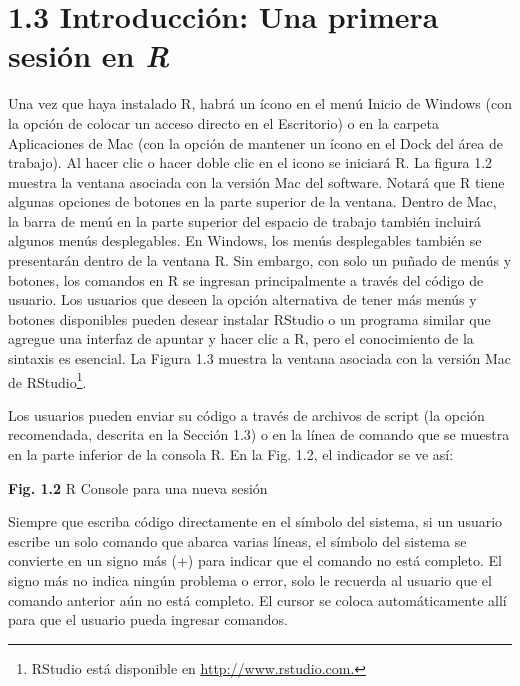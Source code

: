 \documentclass[
]{book}
\begin{document}
\hypertarget{introducciuxf3n-una-primera-sesiuxf3n-en-r}{%
\section*{\texorpdfstring{\textbf{1.3 Introducción: Una primera sesión en \emph{R}}}{1.3 Introducción: Una primera sesión en R}}\label{introducciuxf3n-una-primera-sesiuxf3n-en-r}}

Una vez que haya instalado R, habrá un ícono en el menú Inicio de Windows (con la opción de colocar un acceso directo en el Escritorio) o en la carpeta Aplicaciones de Mac (con la opción de mantener un ícono en el Dock del área de trabajo). Al hacer clic o hacer doble clic en el icono se iniciará R. La figura 1.2 muestra la ventana asociada con la versión Mac del software. Notará que R tiene algunas opciones de botones en la parte superior de la ventana. Dentro de Mac, la barra de menú en la parte superior del espacio de trabajo también incluirá algunos menús desplegables. En Windows, los menús desplegables también se presentarán dentro de la ventana R. Sin embargo, con solo un puñado de menús y botones, los comandos en R se ingresan principalmente a través del código de usuario. Los usuarios que deseen la opción alternativa de tener más menús y botones disponibles pueden desear instalar RStudio o un programa similar que agregue una interfaz de apuntar y hacer clic a R, pero el conocimiento de la sintaxis es esencial. La Figura 1.3 muestra la ventana asociada con la versión Mac de RStudio\footnote{RStudio está disponible en \href{Http://www.rstudio.com}{http://www.rstudio.com.}}.

Los usuarios pueden enviar su código a través de archivos de script (la opción recomendada, descrita en la Sección 1.3) o en la línea de comando que se muestra en la parte inferior de la consola R. En la Fig. 1.2, el indicador se ve así:

\textbf{Fig. 1.2} R Console para una nueva sesión

Siempre que escriba código directamente en el símbolo del sistema, si un usuario escribe un solo comando que abarca varias líneas, el símbolo del sistema se convierte en un signo más (+) para indicar que el comando no está completo. El signo más no indica ningún problema o error, solo le recuerda al usuario que el comando anterior aún no está completo. El cursor se coloca automáticamente allí para que el usuario pueda ingresar comandos.
\end{document}
